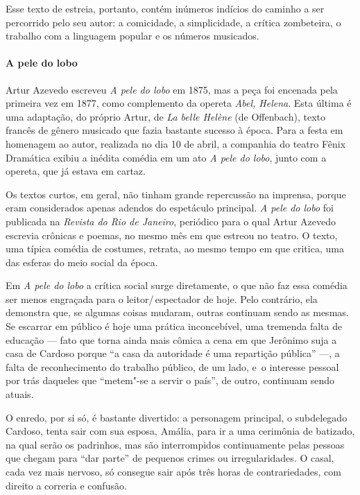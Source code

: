 Esse texto de estreia, portanto, contém inúmeros indícios do caminho a
ser percorrido pelo seu autor: a comicidade, a simplicidade, a crítica
zombeteira, o trabalho com a linguagem popular e os números musicados.

\paragraph{A pele do lobo}
Artur Azevedo escreveu \textit{A pele do lobo} em 1875, mas a peça foi
encenada pela primeira vez em 1877, como complemento da opereta
\textit{Abel, Helena}. Esta última é uma adaptação, do próprio Artur,
de \textit{La belle Helène }(de Offenbach), texto francês de gênero
musicado que fazia bastante sucesso à época. Para a festa em homenagem
ao autor, realizada no dia 10 de abril, a companhia do teatro Fênix
Dramática exibiu a inédita comédia em um ato \textit{A pele do lobo},
junto com a opereta, que já estava em cartaz.

Os textos curtos, em geral, não tinham grande repercussão na imprensa,
porque eram considerados apenas adendos do espetáculo principal.
\textit{A pele do lobo }foi publicada na \textit{Revista do Rio de
Janeiro}, periódico para o qual Artur Azevedo escrevia crônicas e
poemas, no mesmo mês em que estreou no teatro. O texto, uma típica
comédia de costumes, retrata, ao mesmo tempo em que critica, uma das
esferas do meio social da época.

Em \textit{A pele do lobo} a crítica social surge diretamente, o que não
faz essa comédia ser menos engraçada para o leitor/\,espectador de hoje.
Pelo contrário, ela demonstra que, se algumas coisas mudaram, outras
continuam sendo as mesmas. Se escarrar em público é hoje uma prática
inconcebível, uma tremenda falta de educação --- fato que torna ainda
mais cômica a cena em que Jerônimo suja a casa de Cardoso porque “a
casa da autoridade é uma repartição pública” ---, a falta de
reconhecimento do trabalho público, de um lado, \mbox{e o} interesse pessoal
por trás daqueles que “metem"-se a servir o país”, de outro, continuam
sendo atuais.

O enredo, por si só, é bastante divertido: a personagem principal, o
subdelegado Cardoso, tenta sair com sua esposa, Amália, para ir a uma
cerimônia de batizado, na qual serão os padrinhos, mas são
interrompidos continuamente pelas pessoas que chegam para “dar parte”
de pequenos crimes ou irregularidades. O casal, cada vez mais nervoso,
só consegue sair após três horas de contrariedades, com direito a
correria e confusão.

